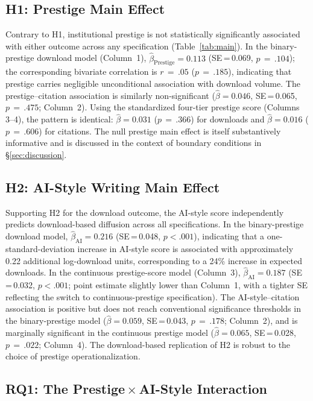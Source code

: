 \documentclass[12pt,a4paper]{article}
\begin{document}
\subsection{H1: Prestige Main Effect}

Contrary to H1, institutional prestige is not statistically significantly
associated with either outcome across any specification
(Table~\ref{tab:main}).
In the binary-prestige download model (Column~1),
$\hat{\beta}_{\text{Prestige}} = 0.113$ (SE\,=\,0.069, $p\,=\,.104$);
the corresponding bivariate correlation is $r\,=\,.05$ ($p\,=\,.185$),
indicating that prestige carries negligible unconditional association
with download volume.
The prestige--citation association is similarly non-significant
($\hat{\beta} = 0.046$, SE\,=\,0.065, $p\,=\,.475$; Column~2).
Using the standardized four-tier prestige score (Columns 3--4),
the pattern is identical: $\hat{\beta} = 0.031$ ($p\,=\,.366$) for
downloads and $\hat{\beta} = 0.016$ ($p\,=\,.606$) for citations.
The null prestige main effect is itself substantively informative
and is discussed in the context of boundary conditions in
§\ref{sec:discussion}.

\subsection{H2: AI-Style Writing Main Effect}

Supporting H2 for the download outcome, the AI-style score independently
predicts download-based diffusion across all specifications.
In the binary-prestige download model,
$\hat{\beta}_{\text{AI}} = 0.216$ (SE\,=\,0.048, $p<.001$),
indicating that a one-standard-deviation increase in AI-style score
is associated with approximately 0.22 additional log-download units,
corresponding to a 24\% increase in expected downloads.
In the continuous prestige-score model (Column~3),
$\hat{\beta}_{\text{AI}} = 0.187$ (SE\,=\,0.032, $p<.001$;
point estimate slightly lower than Column~1, with a tighter SE
reflecting the switch to continuous-prestige specification).
The AI-style--citation association is positive but does not reach
conventional significance thresholds in the binary-prestige model
($\hat{\beta} = 0.059$, SE\,=\,0.043, $p\,=\,.178$; Column~2),
and is marginally significant in the continuous prestige model
($\hat{\beta} = 0.065$, SE\,=\,0.028, $p\,=\,.022$; Column~4).
The download-based replication of H2 is robust to the choice of
prestige operationalization.

\subsection{RQ1: The Prestige\,$\times$\,AI-Style Interaction}
\end{document}
